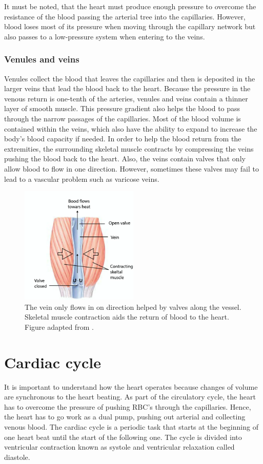 It must be noted, that the heart must produce enough pressure to overcome the resistance of the blood passing the arterial tree into the capillaries. However, blood loses most of its pressure when moving through the capillary network but also passes to a low-pressure system when entering to the veins. 

\subsubsection{Venules and veins}
Venules collect the blood that leaves the capillaries and then is deposited in the larger veins that lead the blood back to the heart. Because the pressure in the venous return is one-tenth of the arteries, venules and veins contain a thinner layer of smooth muscle. This pressure gradient also helps the blood to pass through the narrow passages of the capillaries. Most of the blood volume is contained within the veins, which also have the ability to expand to increase the body's blood capacity if needed. In order to help the blood return from the extremities, the surrounding skeletal muscle contracts by compressing the veins pushing the blood back to the heart. Also, the veins contain valves that only allow blood to flow in one direction. However, sometimes these valves may fail to lead to a vascular problem such as varicose veins. 

\begin{figure}[!htpb]
	\centering
	\includegraphics[width=0.5\textwidth,keepaspectratio]{figure2}    
	\caption[Venous return through skeletal muscle]{The vein only flows in on direction helped by valves along the vessel. Skeletal muscle contraction aids the return of blood to the heart. Figure adapted from \cite{johnson2001biology}. }
	\label{fig:venous return}
\end{figure}

\section{Cardiac cycle}
It is important to understand how the heart operates because changes of volume are synchronous to the heart beating. As part of the circulatory cycle, the heart has to overcome the pressure of pushing RBC's through the capillaries. Hence, the heart has to go work as a dual pump, pushing out arterial and collecting venous blood. The cardiac cycle is a periodic task that starts at the beginning of one heart beat until the start of the following one. The cycle is divided into ventricular contraction known as systole and ventricular relaxation called diastole. 

